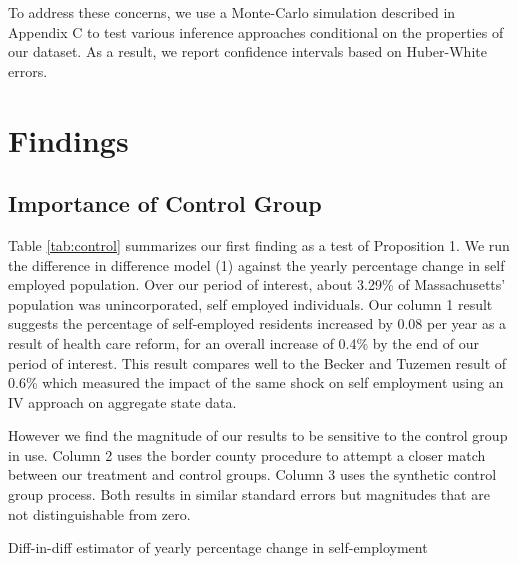 \documentclass[12pt]{article}
\begin{document}
To address these concerns, we use a Monte-Carlo simulation described in Appendix C to test various inference approaches conditional on the properties of our dataset. As a result, we report confidence intervals based on Huber-White errors. 

\section{Findings}
\label{sec:results}

\subsection{Importance of Control Group}

Table \ref{tab:control} summarizes our first finding as a test of Proposition 1. We run the difference in difference model (1) against the yearly percentage change in self employed population. Over our period of interest, about 3.29\% of Massachusetts' population was unincorporated, self employed individuals. Our column 1 result suggests the percentage of self-employed residents increased by 0.08 per year as a result of health care reform, for an overall increase of 0.4\% by the end of our period of interest. This result compares well to the Becker and Tuzemen \cite{tuzemen} result of 0.6\% which measured the impact of the same shock on self employment using an IV approach on aggregate state data. 

However we find the magnitude of our results to be sensitive to the control group in use. Column 2 uses the border county procedure to attempt a closer match between our treatment and control groups. Column 3 uses the synthetic control group process. Both results in similar standard errors but magnitudes that are not distinguishable from zero. 
\begin{center}
	\begin{table}[H]
		\centering
			\caption{Diff-in-diff estimator of yearly percentage change in self-employment} 
			
		\label{tab:control}
	\end{table}		
\end{center}
\begin{comment}
Diff-in-diff model of health care reform from 2000 to 2012 with Massachusetts treated after 2007. Maine, Connecticut, Vermont, Rhode Island and New Hampshire used as controls in column (1). Column (2) restricts the dataset to counties that border other states across Massachusetts, Connecticut, Vermont, Rhode Island, New Hampshire and New York. Column (3) uses a synthetic control model that matches each Massachuetts county pre-trend against US counties with similar income, age, urban and insurance rate characteristics. 
\end{comment}
\end{document}
